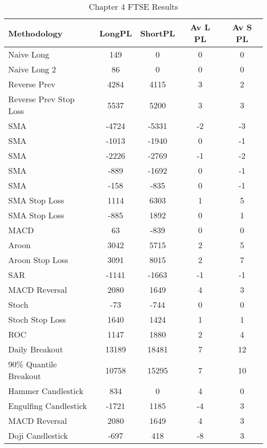 \begin{table}[ht]
\centering
\caption[Chapter 4 FTSE Results]{Chapter 4 FTSE Results} 
\label{tab:chp6:ftse_summary}
\begin{tabular}{lcccc}
  \toprule Methodology & LongPL & ShortPL & Av L PL & Av S PL \\ 
  \midrule Naive Long & 149 & 0 & 0 & 0 \\ 
  Naive Long 2 & 86 & 0 & 0 & 0 \\ 
  Reverse Prev & 4284 & 4115 & 3 & 2 \\ 
  Reverse Prev Stop Loss & 5537 & 5200 & 3 & 3 \\ 
  SMA & -4724 & -5331 & -2 & -3 \\ 
  SMA & -1013 & -1940 & 0 & -1 \\ 
  SMA & -2226 & -2769 & -1 & -2 \\ 
  SMA & -889 & -1692 & 0 & -1 \\ 
  SMA & -158 & -835 & 0 & -1 \\ 
  SMA Stop Loss & 1114 & 6303 & 1 & 5 \\ 
  SMA Stop Loss & -885 & 1892 & 0 & 1 \\ 
  MACD & 63 & -839 & 0 & 0 \\ 
  Aroon & 3042 & 5715 & 2 & 5 \\ 
  Aroon Stop Loss & 3091 & 8015 & 2 & 7 \\ 
  SAR & -1141 & -1663 & -1 & -1 \\ 
  MACD Reversal & 2080 & 1649 & 4 & 3 \\ 
  Stoch & -73 & -744 & 0 & 0 \\ 
  Stoch Stop Loss & 1640 & 1424 & 1 & 1 \\ 
  ROC & 1147 & 1880 & 2 & 4 \\ 
  Daily Breakout & 13189 & 18481 & 7 & 12 \\ 
  90\% Quantile Breakout & 10758 & 15295 & 7 & 10 \\ 
  Hammer Candlestick & 834 & 0 & 4 & 0 \\ 
  Engulfing Candlestick & -1721 & 1185 & -4 & 3 \\ 
  MACD Reversal & 2080 & 1649 & 4 & 3 \\ 
  Doji Candlestick & -697 & 418 & -8 & 3 \\ 
   \bottomrule \end{tabular}
\end{table}
